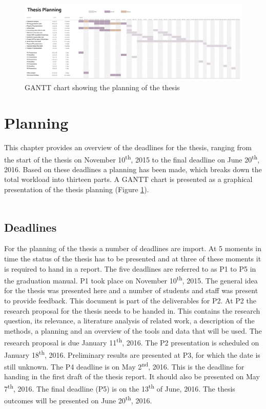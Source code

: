 

\begin{figure}
	\centering
	\includegraphics[width=1.5\linewidth, angle=90]{figs/GANTT-chart.png}
	\caption{GANTT chart showing the planning of the thesis}
	\label{fig:GANTT}
\end{figure}

\section{Planning}
\label{chap:planning}

This chapter provides an overview of the deadlines for the thesis, ranging from the start of the thesis on November 10\textsuperscript{th}, 2015 to the final deadline on June 20\textsuperscript{th}, 2016. Based on these deadlines a planning has been made, which breaks down the total workload into thirteen parts. A GANTT chart is presented as a graphical presentation of the thesis planning (Figure \ref{fig:GANTT}). \\ \mbox{} \\

\subsection{Deadlines}
For the planning of the thesis a number of deadlines are import. At 5 moments in time the status of the thesis has to be presented and at three of these moments it is required to hand in a report. The five deadlines are referred to as P1 to P5 in the graduation manual. P1 took place on November 10\textsuperscript{th}, 2015. The general idea for the thesis was presented here and a number of students and staff was present to provide feedback. This document is part of the deliverables for P2. At P2 the research proposal for the thesis needs to be handed in. This contains the research question, its relevance, a literature analysis of related work, a description of the methods, a planning and an overview of the tools and data that will be used. The research proposal is due January 11\textsuperscript{th}, 2016. The P2 presentation is scheduled on January 18\textsuperscript{th}, 2016. Preliminary results are presented at P3, for which the date is still unknown. The P4 deadline is on May 2\textsuperscript{nd}, 2016. This is the deadline for handing in the first draft of the thesis report. It should also be presented on May 7\textsuperscript{th}, 2016. The final deadline (P5) is on the 13\textsuperscript{th} of June, 2016. The thesis outcomes will be presented on June 20\textsuperscript{th}, 2016.

